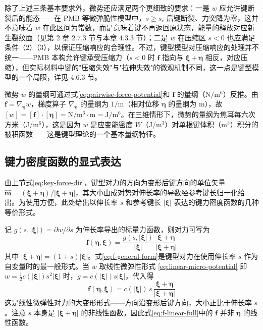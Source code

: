 除了上述三条基本要求外，微势还应满足两个更细致的要求：一是 $w$ 应允许键断裂后的能态——在 PMB 等微弹脆性模型中，$s\geq s_c$ 后键断裂、力突降为零，这并不意味着 $w$ 在此区间为常数，而是意味着键不再返回原状态，能量的释放对应新生裂纹面（见第 2 章 2.7.3 节与本章 4.3.3 节）；二是 $w$ 在压缩区 $s<0$ 也应满足条件（2）（3），以保证压缩响应的合理性。不过，键型模型对压缩响应的处理并不统一——PMB 本构允许键承受压缩力（$s<0$ 时 $\mathbf{f}$ 指向与 $\boldsymbol{\xi}+\boldsymbol{\eta}$ 相反，对应压缩），但实际材料中键的"压缩失效"与"拉伸失效"的微观机制不同，这一点是键型模型的一个局限，详见 4.6.3 节。

微势 $w$ 的量纲可通过式\eqref{eq:pairwise-force-potential}和 $\mathbf{f}$ 的量纲（$\mathrm{N}/\mathrm{m}^{6}$）反推。由 $\mathbf{f}=\nabla_{\boldsymbol{\eta}}w$，梯度算子 $\nabla_{\boldsymbol{\eta}}$ 的量纲为 $1/\mathrm{m}$（相对位移 $\boldsymbol{\eta}$ 的量纲为 $\mathrm{m}$），故 $[w]=[\mathbf{f}]\cdot[\boldsymbol{\eta}]=\mathrm{N}/\mathrm{m}^{6}\cdot\mathrm{m}=\mathrm{J}/\mathrm{m}^{6}$。在三维情形下，微势的量纲为焦耳每六次方米（J/m$^{6}$），这是因为 $w$ 是应变能密度 $W$（J/m$^{3}$）对单根键体积（m$^{3}$）积分的被积函数——这是键型理论的一个基本量纲特征。

\subsection{键力密度函数的显式表达}

由上节式\eqref{eq:key-force-dir}，键型对力的方向为变形后键方向的单位矢量 $\hat{\mathbf{m}}=(\boldsymbol{\xi}+\boldsymbol{\eta})/|\boldsymbol{\xi}+\boldsymbol{\eta}|$，其大小由成对势对伸长率的导数经参考键长归一化给出。为使用方便，此处给出以伸长率 $s$ 和参考键长 $|\boldsymbol{\xi}|$ 表达的键力密度函数的几种等价形式。

记 $g(s,|\boldsymbol{\xi}|)=\partial w/\partial s$ 为伸长率导出的标量力函数，则对力可写为
\begin{equation}
\mathbf{f}(\boldsymbol{\eta},\boldsymbol{\xi}) = \frac{g(s,|\boldsymbol{\xi}|)}{|\boldsymbol{\xi}|}\,
\frac{\boldsymbol{\xi}+\boldsymbol{\eta}}{|\boldsymbol{\xi}+\boldsymbol{\eta}|}
\label{eq:f-general-form}
\end{equation}
其中 $|\boldsymbol{\xi}+\boldsymbol{\eta}|=(1+s)|\boldsymbol{\xi}|$。式\eqref{eq:f-general-form}是键型对力在使用伸长率 $s$ 作为自变量时的最一般形式。当 $w$ 取线性微弹性形式 \eqref{eq:linear-micro-potential} 即 $w=\tfrac{1}{2}c(|\boldsymbol{\xi}|)s^{2}|\boldsymbol{\xi}|$ 时，$g=c(|\boldsymbol{\xi}|)s|\boldsymbol{\xi}|$，代入得
\begin{equation}
\mathbf{f}(\boldsymbol{\eta},\boldsymbol{\xi}) = c(|\boldsymbol{\xi}|)\,s\,\frac{\boldsymbol{\xi}+\boldsymbol{\eta}}{|\boldsymbol{\xi}+\boldsymbol{\eta}|}
\label{eq:f-linear-full}
\end{equation}
这是线性微弹性对力的大变形形式——方向沿变形后键方向，大小正比于伸长率 $s$。注意 $s$ 本身是 $|\boldsymbol{\xi}+\boldsymbol{\eta}|$ 的非线性函数，因此式\eqref{eq:f-linear-full}中的 $\mathbf{f}$ 并非 $\boldsymbol{\eta}$ 的线性函数。


